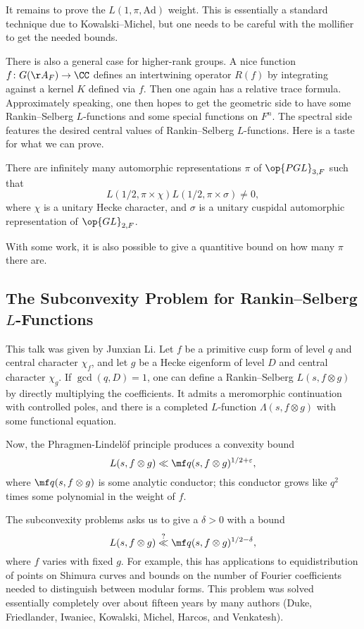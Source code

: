 \documentclass{article}
\begin{document}
It remains to prove the $L(1,\pi,\mathrm{Ad})$ weight. This is essentially a standard technique due to Kowalski--Michel, but one needs to be careful with the mollifier to get the needed bounds.

There is also a general case for higher-rank groups. A nice function $f\colon G(\AA_F)\to\CC$ defines an intertwining operator $R(f)$ by integrating against a kernel $K$ defined via $f$. Then one again has a relative trace formula. Approximately speaking, one then hopes to get the geometric side to have some Rankin--Selberg $L$-functions and some special functions on $F^n$. The spectral side features the desired central values of Rankin--Selberg $L$-functions. Here is a taste for what we can prove.
\begin{theorem}
	There are infinitely many automorphic representations $\pi$ of $\op{PGL}_{3,F}$ such that
	\[L(1/2,\pi\times\chi)L(1/2,\pi\times\sigma)\ne0,\]
	where $\chi$ is a unitary Hecke character, and $\sigma$ is a unitary cuspidal automorphic representation of $\op{GL}_{2,F}$.
\end{theorem}
With some work, it is also possible to give a quantitive bound on how many $\pi$ there are.

\subsection{The Subconvexity Problem for Rankin--Selberg \texorpdfstring{$L$}{ L}-Functions}
This talk was given by Junxian Li. Let $f$ be a primitive cusp form of level $q$ and central character $\chi_f$, and let $g$ be a Hecke eigenform of level $D$ and central character $\chi_g$. If $\gcd(q,D)=1$, one can define a Rankin--Selberg $L(s,f\otimes g)$ by directly multiplying the coefficients. It admits a meromorphic continuation with controlled poles, and there is a completed $L$-function $\Lambda(s,f\otimes g)$ with some functional equation.

Now, the Phragmen-Lindel\"of principle produces a convexity bound
\[L(s,f\otimes g)\ll\mf q(s,f\otimes g)^{1/2+\varepsilon},\]
where $\mf q(s,f\otimes g)$ is some analytic conductor; this conductor grows like $q^2$ times some polynomial in the weight of $f$.

The subconvexity problems asks us to give a $\delta>0$ with a bound
\[L(s,f\otimes g)\stackrel?\ll\mf q(s,f\otimes g)^{1/2-\delta},\]
where $f$ varies with fixed $g$. For example, this has applications to equidistribution of points on Shimura curves and bounds on the number of Fourier coefficients needed to distinguish between modular forms. This problem was solved essentially completely over about fifteen years by many authors (Duke, Friedlander, Iwaniec, Kowalski, Michel, Harcos, and Venkatesh).
\end{document}

